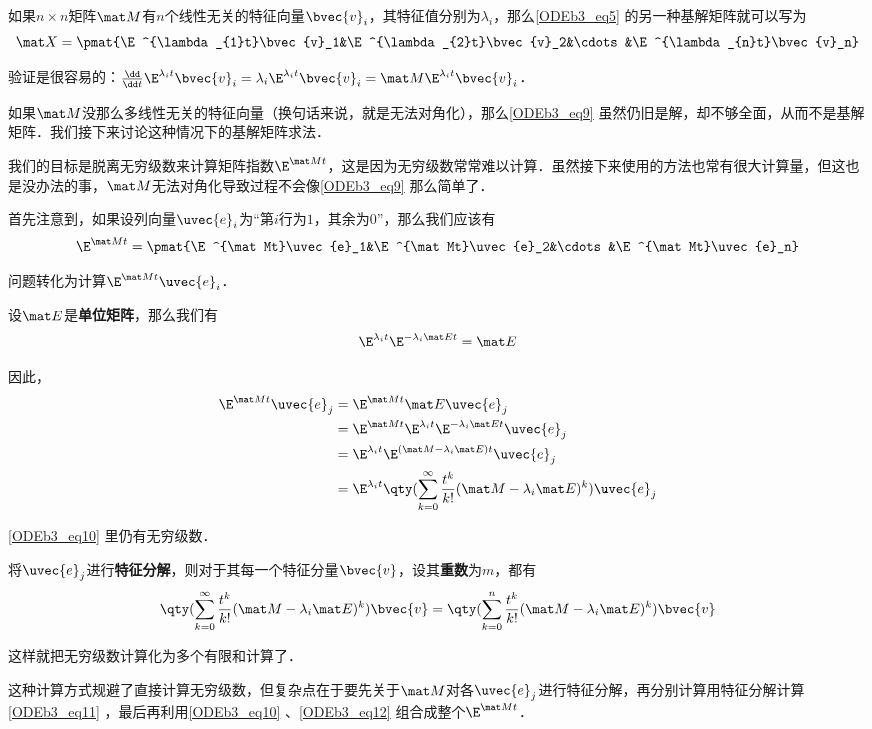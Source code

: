 如果$n\times n$矩阵$\mat M$有$n$个线性无关的特征向量$\bvec{v}_i$，其特征值分别为$\lambda_i$，那么\autoref{ODEb3_eq5} 的另一种基解矩阵就可以写为
\begin{equation}\label{ODEb3_eq9}
\mat X=\pmat{\E^{\lambda_{1}t}\bvec{v}_1&\E^{\lambda_{2}t}\bvec{v}_2&\cdots&\E^{\lambda_{n}t}\bvec{v}_n}
\end{equation}

验证是很容易的：$\frac{\dd}{\dd t}\E^{\lambda_{i}t}\bvec{v}_i=\lambda_i\E^{\lambda_{i}t}\bvec{v}_i=\mat M\E^{\lambda_{i}t}\bvec{v}_i$．

如果$\mat M$没那么多线性无关的特征向量（换句话来说，就是无法对角化），那么\autoref{ODEb3_eq9} 虽然仍旧是解，却不够全面，从而不是基解矩阵．我们接下来讨论这种情况下的基解矩阵求法．

我们的目标是脱离无穷级数来计算矩阵指数$\E^{\mat Mt}$，这是因为无穷级数常常难以计算．虽然接下来使用的方法也常有很大计算量，但这也是没办法的事，$\mat M$无法对角化导致过程不会像\autoref{ODEb3_eq9} 那么简单了．

首先注意到，如果设列向量$\uvec{e}_i$为“第$i$行为$1$，其余为$0$”，那么我们应该有
\begin{equation}\label{ODEb3_eq12}
\E^{\mat Mt}=\pmat{\E^{\mat Mt}\uvec{e}_1&\E^{\mat Mt}\uvec{e}_2&\cdots&\E^{\mat Mt}\uvec{e}_n}
\end{equation}

问题转化为计算$\E^{\mat Mt}\uvec{e}_i$．

设$\mat E$是\textbf{单位矩阵}，那么我们有
\begin{equation}
\E^{\lambda_it}\E^{-\lambda_i\mat Et}=\mat E
\end{equation}

因此，
\begin{equation}\label{ODEb3_eq10}
\begin{aligned}
\E^{\mat Mt}\uvec{e}_j&=\E^{\mat Mt}\mat E\uvec{e}_j\\
&=\E^{\mat Mt}\E^{\lambda_it}\E^{-\lambda_i\mat Et}\uvec{e}_j\\
&=\E^{\lambda_it}\E^{(\mat M-\lambda_i\mat E)t}\uvec{e}_j\\
&=\E^{\lambda_it}\qty(\sum_{k=0}^\infty \frac{t^k}{k!}(\mat M-\lambda_i\mat E)^k)\uvec{e}_j
\end{aligned}
\end{equation}

\autoref{ODEb3_eq10} 里仍有无穷级数．

将$\uvec{e}_j$进行\textbf{特征分解}，则对于其每一个特征分量$\bvec{v}$，设其\textbf{重数}为$m$，都有
\begin{equation}\label{ODEb3_eq11}
\qty(\sum_{k=0}^\infty \frac{t^k}{k!}(\mat M-\lambda_i\mat E)^k)\bvec{v}=\qty(\sum_{k=0}^n \frac{t^k}{k!}(\mat M-\lambda_i\mat E)^k)\bvec{v}
\end{equation}

这样就把无穷级数计算化为多个有限和计算了．

这种计算方式规避了直接计算无穷级数，但复杂点在于要先关于$\mat M$对各$\uvec{e}_j$进行特征分解，再分别计算用特征分解计算\autoref{ODEb3_eq11} ，最后再利用\autoref{ODEb3_eq10} 、\autoref{ODEb3_eq12} 组合成整个$\E^{\mat Mt}$．









